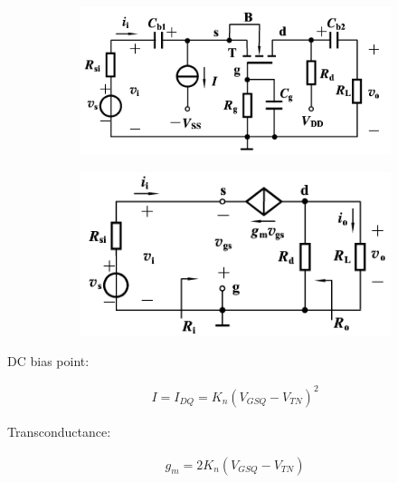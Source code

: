 \begin{figure}[H]
  \centering
  \begin{subfigure}{.5\textwidth}
    \centering
    \includegraphics[width=\linewidth]{figures/MOSFET-Common-G}
  \end{subfigure}
  \begin{subfigure}{.45\textwidth}
    \centering
    \includegraphics[width=\linewidth]{figures/MOSFET-Common-Gs}
  \end{subfigure}
\end{figure}

DC bias point:

\begin{equation*}
  \begin{aligned}
    I = I_{DQ} = K_n \left( V_{GSQ} - V_{TN} \right)^2
  \end{aligned}
\end{equation*}

Transconductance:

\begin{equation*}
  \begin{aligned}
    g_m = 2 K_n \left( V_{GSQ} - V_{TN} \right)
  \end{aligned}
\end{equation*}

